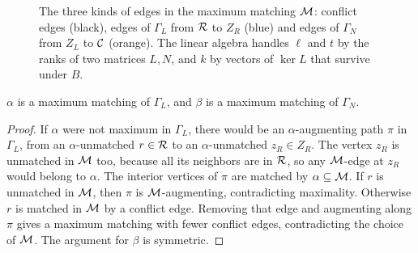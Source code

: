 \begin{figure}[ht]
\centering
{}
\caption{The three kinds of edges in the maximum matching $\mathcal M$: conflict
edges (black), edges of $\Gamma_L$ from $\mathcal R$ to $Z_R$ (blue) and edges of
$\Gamma_N$ from $Z_L$ to $\mathcal C$ (orange). The linear algebra handles $\ell$ and $t$
by the ranks of two matrices $L,N$, and $k$ by vectors of $\ker L$ that
survive under $B$.}
\label{fig:decomposition}
\end{figure}

\begin{claim}\label{cl:alpha-max}
$\alpha$ is a maximum matching of $\Gamma_L$, and $\beta$ is a maximum matching of $\Gamma_N$.
\end{claim}

\begin{proof}
If $\alpha$ were not maximum in $\Gamma_L$, there would be an $\alpha$-augmenting
path $\pi$ in $\Gamma_L$, from an $\alpha$-unmatched $r\in\mathcal R$ to an $\alpha$-unmatched
$z_R\in Z_R$. The vertex $z_R$ is unmatched in $\mathcal M$ too, because all its
neighbors are in $\mathcal R$, so any $\mathcal M$-edge at $z_R$ would belong to $\alpha$.
The interior vertices of $\pi$ are matched by $\alpha\subseteq\mathcal M$. If $r$ is
unmatched in $\mathcal M$, then $\pi$ is $\mathcal M$-augmenting, contradicting maximality.
Otherwise $r$ is matched in $\mathcal M$ by a conflict edge. Removing that edge and
augmenting along $\pi$ gives a maximum matching with fewer conflict edges,
contradicting the choice of $\mathcal M$. The argument for $\beta$ is symmetric.
\end{proof}


